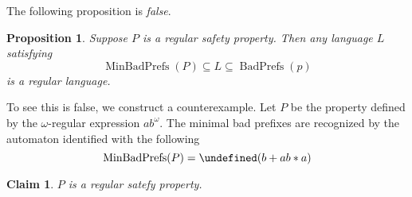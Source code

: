 \documentclass[letterpaper,11pt]{article}
\newtheorem{prop}{Proposition}
\newtheorem{claim}{Claim}
\DeclareMathOperator{\MBP}{MinBadPrefs}
\DeclareMathOperator{\BP}{BadPrefs}
\let\L\undefined
\DeclareMathOperator{\L}{\mathcal{L}}
\begin{document}
The following proposition is \emph{false}.

\begin{prop}
    Suppose $P$ is a regular safety property. Then any language $L$
    satisfying
    \begin{equation}
        \label{eq:lcondition}
        \MBP(P) \subseteq L \subseteq \BP(p)
    \end{equation}
    is a regular language.
\end{prop}

To see this is false, we construct a counterexample. Let $P$ be the property
defined by the $\omega$-regular expression $ab^\omega$. The minimal bad
prefixes are recognized by the automaton identified with the following 
\begin{equation*}
    \MBP(P) = \L(b + ab*a)
\end{equation*}

\begin{claim}
    $P$ is a regular satefy property.
\end{claim}
\end{document}
